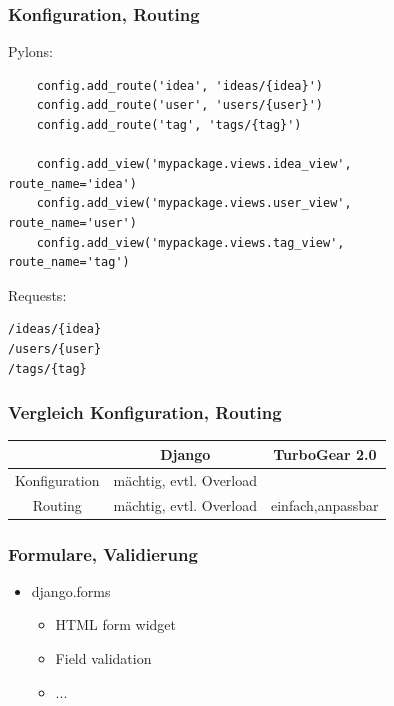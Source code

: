 \documentclass[
    t,
    smaller,
    compress,
]{beamer}
\begin{document}
\begin{frame}[fragile]

\frametitle{Konfiguration, Routing}
Pylons:

\begin{lstlisting}
	config.add_route('idea', 'ideas/{idea}')
	config.add_route('user', 'users/{user}')
	config.add_route('tag', 'tags/{tag}')

	config.add_view('mypackage.views.idea_view', 					route_name='idea')
	config.add_view('mypackage.views.user_view', 					route_name='user')
	config.add_view('mypackage.views.tag_view', 						route_name='tag')
\end{lstlisting}

Requests:

\begin{lstlisting}
/ideas/{idea}
/users/{user}
/tags/{tag}
\end{lstlisting}
	
\end{frame}

\begin{frame}
	\frametitle{Vergleich Konfiguration, Routing}
	
	
	\begin{table}[h]
		\begin{tabular}{|c|c|c|}
			\hline
			 & Django & TurboGear 2.0  \\ \hline
		  	Konfiguration & \cellcolor{orange} mächtig, evtl. Overload  &  \\ \hline
		  	Routing & \cellcolor{orange} mächtig, evtl. Overload & \cellcolor{green} einfach,anpassbar	   \\ \hline
		 \end{tabular}
	\end{table}

	
\end{frame}

\begin{frame}
  \frametitle{Formulare, Validierung}
  
  \begin{itemize}[<1->]
    \item django.forms
	 \begin{itemize}[<1->]
		\item HTML form widget
		\item Field validation
		\item ...
	\end{itemize}
  \end{itemize}

\end{frame}
\end{document}
